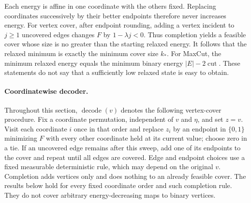 \documentclass[11pt]{article}
\theoremstyle{definition}\newtheorem{definition}[theorem]{Definition}
\theoremstyle{remark}\newtheorem{remark}[theorem]{Remark}
\numberwithin{equation}{section}
\newcommand{\1}{\mathbf 1}
\begin{document}
Each energy is affine in one coordinate with the others fixed. Replacing coordinates successively by their better endpoints therefore never increases energy. For vertex cover, after endpoint rounding, adding a vertex incident to $j\ge1$ uncovered edges changes $F$ by $1-\lambda j<0$. Thus completion yields a feasible cover whose size is no greater than the starting relaxed energy. It follows that the relaxed minimum is exactly the minimum cover size $k_*$. For MaxCut, the minimum relaxed energy equals the minimum binary energy $|E|-2\operatorname{cut}$. These statements do not say that a sufficiently low relaxed state is easy to obtain.

\paragraph{Coordinatewise decoder.}
Throughout this section, $\operatorname{decode}(v)$ denotes the following vertex-cover procedure. Fix a coordinate permutation, independent of $v$ and $\eta$, and set $z=v$. Visit each coordinate $i$ once in that order and replace $z_i$ by an endpoint in $\{0,1\}$ minimizing $F$ with every other coordinate held at its current value; choose zero in a tie. If an uncovered edge remains after this sweep, add one of its endpoints to the cover and repeat until all edges are covered. Edge and endpoint choices use a fixed measurable deterministic rule, which may depend on the original $v$. Completion adds vertices only and does nothing to an already feasible cover. The results below hold for every fixed coordinate order and such completion rule. They do not cover arbitrary energy-decreasing maps to binary vertices.
\end{document}
